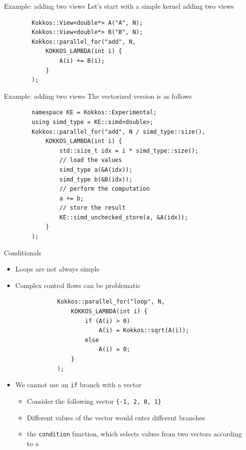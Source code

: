 \documentclass[
    aspectratio=169,
    \createHandout
]{beamer}
\begin{document}
\begin{frame}[fragile]{Example: adding two views}
    Let's start with a simple kernel adding two views
    \begin{verbatim}
        Kokkos::View<double*> A("A", N);
        Kokkos::View<double*> B("B", N);
        Kokkos::parallel_for("add", N,
            KOKKOS_LAMBDA(int i) {
                A(i) += B(i);
            }
        );
    \end{verbatim}
\end{frame}

\begin{frame}[fragile]{Example: adding two views}
    The vectorized version is as follows
    \begin{verbatim}
        namespace KE = Kokkos::Experimental;
        using simd_type = KE::simd<double>;
        Kokkos::parallel_for("add", N / simd_type::size(),
            KOKKOS_LAMBDA(int i) {
                std::size_t idx = i * simd_type::size();
                // load the values
                simd_type a(&A(idx));
                simd_type b(&B(idx));
                // perform the computation
                a += b;
                // store the result
                KE::simd_unchecked_store(a, &A(idx));
            }
        );
    \end{verbatim}
\end{frame}

\begin{frame}[fragile]{Conditionals}
    \begin{itemize}
        \item Loops are not always simple
        \item Complex control flows can be problematic
        \begin{verbatim}
            Kokkos::parallel_for("loop", N,
                KOKKOS_LAMBDA(int i) {
                    if (A(i) > 0)
                        A(i) = Kokkos::sqrt(A(i));
                    else
                        A(i) = 0;
                }
            );
        \end{verbatim}
        \item We cannot use an \texttt{if} branch with a vector
            \begin{itemize}
                \item Consider the following vector \texttt{\{-1, 2, 0, 1\}}
                \item Different values of the vector would enter different branches
                \item {} the \texttt{condition} function, which selects values from two vectors according to a 
            \end{itemize}
    \end{itemize}
\end{frame}
\end{document}
